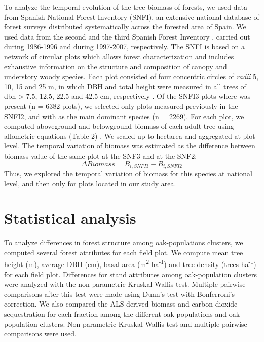 To analyze the temporal evolution of the tree biomass of \Qp forests, we used data from Spanish National Forest Inventory (SNFI), an extensive national database of forest surveys distributed systematically across the forested area of Spain. We used data from the second \autocites[SNFI2][]{
VillaescusaDiaz1998SegundoInventario} and the third Spanish Forest Inventory \autocites[SNFI3][]{Villanueva2005TercerInventario}, carried out during 1986-1996 and during 1997-2007, respectively. The SNFI is based on a network of circular plots which allows forest characterization and includes exhaustive information on the structure and composition of canopy and understory woody species. Each plot consisted of four concentric circles of \emph{radii} 5, 10, 15 and 25 m, in which DBH and total height were measured in all trees of dbh \textgreater{} 7.5, 12.5, 22.5 and 42.5 cm, respectively \autocite{Alberdietal2016SpanishNational}. Of the SNFI3 plots where \Qp was present (n = 6382 plots), we selected only plots measured previously in the SNFI2, and with \Qp as the main dominant species (n = 2269). For each plot, we computed aboveground and belowground biomass of each \Qp adult tree using allometric equations (Table 2) \autocite{RuizPeinadoetal2012BiomassModels}. We scaled-up to hectarea and aggregated at plot level. The temporal variation of biomass was estimated as the difference between biomass value of the same plot at the SNF3 and at the SNF2: \[\Delta Biomass = B_{i, SNFI3} - B_{i, SNFI2}\]
Thus, we explored the temporal variation of biomass for this species at national level, and then only for plots located in our study area.

\section{Statistical analysis}\label{sec:carbon:analysis}
To analyze differences in forest structure among oak-populations clusters, we computed several forest attributes for each field plot. We compute mean tree height (m), average DBH (cm), basal area (m\textsuperscript{2} ha\textsuperscript{-1}) and tree density (trees ha\textsuperscript{-1}) for each field plot. Differences for stand attributes among oak-population clusters were analyzed with the non-parametric Kruskal-Wallis test. Multiple pairwise comparisons after this test were made using Dunn's test with Bonferroni's correction. We also compared the ALS-derived biomass and carbon dioxide sequestration for each fraction among the different oak populations and oak-population clusters. Non parametric Kruskal-Wallis test and multiple pairwise comparisons were used.

